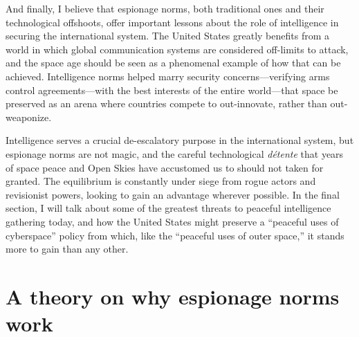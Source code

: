 \documentclass{report}
\begin{document}
And finally, I believe that espionage norms, both traditional ones and their technological offshoots, offer important lessons about the role of intelligence in securing the international system. The United States greatly benefits from a world in which global communication systems are considered off-limits to attack, and the space age should be seen as a phenomenal example of how that can be achieved. Intelligence norms helped marry security concerns---verifying arms control agreements---with the best interests of the entire world---that space be preserved as an arena where countries compete to out-innovate, rather than out-weaponize.

Intelligence serves a crucial de-escalatory purpose in the international system, but espionage norms are not magic, and the careful technological \emph{d\'etente} that years of space peace and Open Skies have accustomed us to should not taken for granted. The equilibrium is constantly under siege from rogue actors and revisionist powers, looking to gain an advantage wherever possible. In the final section, I will talk about some of the greatest threats to peaceful intelligence gathering today, and how the United States might preserve a ``peaceful uses of cyberspace'' policy from which, like the ``peaceful uses of outer space,'' it stands more to gain than any other.



\section{A theory on why espionage norms work}
\end{document}
